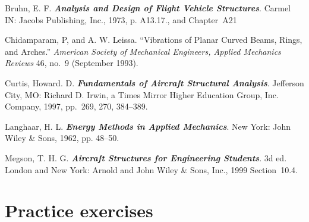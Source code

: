 \documentclass{AeroStructure-ERJohnson}
\begin{document}
\vspace*{-1pc}

\begin{thebibliography}{}\label{sec7.5}
\bibitem{} Bruhn, E. F. \textit{\textbf{Analysis and Design of Flight Vehicle Structures}}. Carmel IN: Jacobs Publishing, Inc., 1973, p. A13.17., and Chapter~A21

\bibitem{} Chidamparam, P, and A. W. Leissa. ``Vibrations of Planar Curved Beams, Rings, and Arches.'' \textit{American Society of Mechanical Engineers, Applied Mechanics Reviews} 46, no.~9 (September 1993).

\bibitem{} Curtis, Howard. D. \textit{\textbf{Fundamentals of Aircraft Structural Analysis}}. Jefferson City, MO: Richard D. Irwin, a Times Mirror Higher Education Group, Inc. Company, 1997, pp.~269, 270, 384--389.

\bibitem{} Langhaar, H. L. \textit{\textbf{Energy Methods in Applied Mechanics}}. New York: John Wiley \& Sons, 1962, pp. 48--50.

\bibitem{} Megson, T. H. G. \textit{\textbf{Aircraft Structures for Engineering Students}}. 3d ed. London and New York: Arnold and John Wiley \& Sons, Inc., 1999 Section~10.4.
\end{thebibliography}

\clearpage

\section{Practice exercises}\label{sec7.6}
\end{document}
